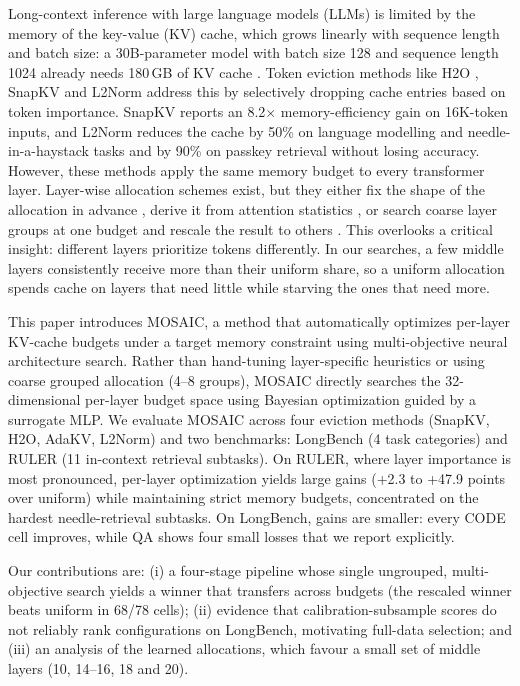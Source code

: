 \documentclass[11pt]{article}
\begin{document}
Long-context inference with large language models (LLMs) is limited by the memory of the key-value (KV) cache, which grows linearly with sequence length and batch size: a 30B-parameter model with batch size 128 and sequence length 1024 already needs 180\,GB of KV cache \citep{zhang2023h2o}. Token eviction methods like H2O \citep{zhang2023h2o}, SnapKV \citep{li2024snapkv} and L2Norm \citep{devoto2024l2norm} address this by selectively dropping cache entries based on token importance. SnapKV reports an 8.2$\times$ memory-efficiency gain on 16K-token inputs, and L2Norm reduces the cache by 50\% on language modelling and needle-in-a-haystack tasks and by 90\% on passkey retrieval without losing accuracy. However, these methods apply the same memory budget to every transformer layer. Layer-wise allocation schemes exist, but they either fix the shape of the allocation in advance \citep{cai2025pyramidkv}, derive it from attention statistics \citep{qin2025cake}, or search coarse layer groups at one budget and rescale the result to others \citep{yu2025evolkv}. This overlooks a critical insight: different layers prioritize tokens differently. In our searches, a few middle layers consistently receive more than their uniform share, so a uniform allocation spends cache on layers that need little while starving the ones that need more.

This paper introduces MOSAIC, a method that automatically optimizes per-layer KV-cache budgets under a target memory constraint using multi-objective neural architecture search. Rather than hand-tuning layer-specific heuristics or using coarse grouped allocation (4–8 groups), MOSAIC directly searches the 32-dimensional per-layer budget space using Bayesian optimization guided by a surrogate MLP. We evaluate MOSAIC across four eviction methods (SnapKV, H2O, AdaKV, L2Norm) and two benchmarks: LongBench (4 task categories) and RULER (11 in-context retrieval subtasks). On RULER, where layer importance is most pronounced, per-layer optimization yields large gains (+2.3 to +47.9 points over uniform) while maintaining strict memory budgets, concentrated on the hardest needle-retrieval subtasks. On LongBench, gains are smaller: every CODE cell improves, while QA shows four small losses that we report explicitly.

Our contributions are: (i) a four-stage pipeline whose single ungrouped, multi-objective search yields a winner that transfers across budgets (the rescaled winner beats uniform in 68/78 cells); (ii) evidence that calibration-subsample scores do not reliably rank configurations on LongBench, motivating full-data selection; and (iii) an analysis of the learned allocations, which favour a small set of middle layers (10, 14--16, 18 and 20).
\end{document}

